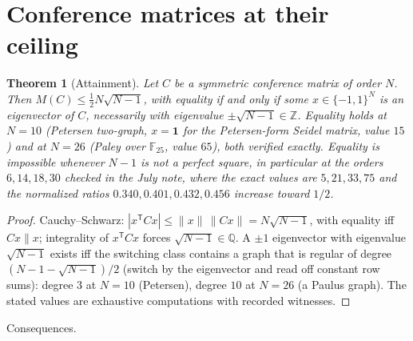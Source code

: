 \documentclass[11pt]{article}
\newtheorem{theorem}{Theorem}[section]
\theoremstyle{remark}
\newcommand{\eps}{\{-1,1\}}
\begin{document}
\section{Conference matrices at their ceiling}\label{sec:attain}

\begin{theorem}[Attainment]\label{thm:attain}
Let $C$ be a symmetric conference matrix of order $N$. Then
$M(C)\le\tfrac12N\sqrt{N-1}$, with equality if and only if some
$x\in\eps^N$ is an eigenvector of $C$, necessarily with eigenvalue
$\pm\sqrt{N-1}\in\mathbb Z$. Equality holds at $N=10$ (Petersen
two-graph, $x=\mathbf1$ for the Petersen-form Seidel matrix, value
$15$) and at $N=26$ (Paley over $\mathbb F_{25}$, value $65$), both
verified exactly. Equality is impossible whenever $N-1$ is not a
perfect square, in particular at the orders $6,14,18,30$ checked in
the July note, where the exact values are $5,21,33,75$ and the
normalized ratios $0.340,0.401,0.432,0.456$ increase toward $1/2$.
\end{theorem}
\begin{proof}
Cauchy--Schwarz: $|x^{\mathsf T}Cx|\le\|x\|\,\|Cx\|=N\sqrt{N-1}$, with
equality iff $Cx\parallel x$; integrality of $x^{\mathsf T}Cx$ forces
$\sqrt{N-1}\in\mathbb Q$. A $\pm1$ eigenvector with eigenvalue
$\sqrt{N-1}$ exists iff the switching class contains a graph that is
regular of degree $(N-1-\sqrt{N-1})/2$ (switch by the eigenvector and
read off constant row sums): degree $3$ at $N=10$ (Petersen), degree
$10$ at $N=26$ (a Paulus graph). The stated values are exhaustive
computations with recorded witnesses.
\end{proof}

Consequences.
\end{document}
